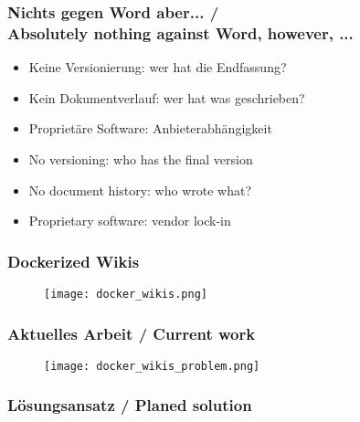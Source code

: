 \documentclass{beamer}
\begin{document}
\begin{frame}
  \frametitle{Nichts gegen Word\textsuperscript{\tiny\textregistered} aber... / \\
    \textcolor{mfn_green}{Absolutely nothing against Word\textsuperscript{\tiny\textregistered}, however, ...}}
  \begin{itemize}
  \item{Keine Versionierung: wer hat die Endfassung?}
  \item{Kein Dokumentverlauf: wer hat was geschrieben?}
  \item{Proprietäre Software: Anbieterabhängigkeit}
  \end{itemize}
  
  \begin{itemize}
  \item{\textcolor{mfn_green}{No versioning: who has the final version}}
  \item{\textcolor{mfn_green}{No document history: who wrote what?}}
  \item{\textcolor{mfn_green}{Proprietary software: vendor lock-in}}
  \end{itemize}
\end{frame}

%
%
\begin{frame}
  \frametitle{Dockerized Wikis}
  \begin{figure}
    \texttt{[image: docker\_wikis.png]}
  \end{figure}
\end{frame}


%
%

\begin{frame}
  \frametitle{Aktuelles Arbeit / \textcolor{mfn_green}{Current work}}
  \begin{figure}
    \texttt{[image: docker\_wikis\_problem.png]}
  \end{figure}
\end{frame}

\begin{frame}
  \frametitle{Lösungsansatz / \textcolor{mfn_green}{Planed solution}}
\end{frame}



\end{document}
